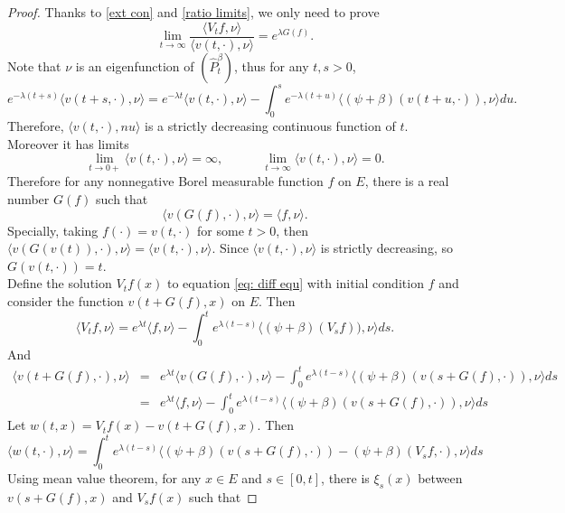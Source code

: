 \documentclass[12pt,a4paper]{amsart}
\theoremstyle{plain}
\theoremstyle{definition}
\numberwithin{equation}{section}
\begin{document}
\begin{proof}
	Thanks to \eqref{ext con} and \eqref{ratio limits}, we only need to prove
\begin{equation}\label{spec ratio}
	\lim_{t\rightarrow\infty}\frac{\langle V_tf,\nu\rangle }{\langle v(t,\cdot),\nu\rangle }=e^{\lambda G(f)}.
\end{equation}
	Note that $\nu$ is an eigenfunction of {\color{red}$(\widehat P^\beta_t)$}, thus for any $t,s>0$,
\begin{equation}\label{ident: monotone}
 	e^{-\lambda(t+s)}\langle v(t+s,\cdot),\nu\rangle =e^{-\lambda t}\langle v(t,\cdot),\nu\rangle -\int_0^se^{-\lambda(t+u)}\langle (\psi+\beta)(v(t+u,\cdot)),\nu\rangle du.
\end{equation}
 	Therefore, $\langle v(t,\cdot),nu\rangle $ is a strictly decreasing continuous function of $t$.  Moreover it has limits
\[
	\lim_{t\rightarrow 0+}\langle v(t,\cdot),\nu\rangle =\infty,\qquad\quad \lim_{t\rightarrow\infty}\langle v(t,\cdot),\nu\rangle =0.
\]
	Therefore for any nonnegative Borel measurable function $f$ on $E$, there is a real number $G(f)$ such that
\begin{equation}\label{def of G}
	\langle v(G(f),\cdot),\nu\rangle =\langle f,\nu\rangle .
\end{equation}
	Specially, taking $f(\cdot)=v(t,\cdot)$ for some $t>0$, then $\langle v(G(v(t)),\cdot),\nu\rangle =\langle v(t,\cdot),\nu\rangle $.
	Since  $\langle v(t,\cdot),\nu\rangle $ is strictly decreasing, so $G(v(t,\cdot))=t$.\\
	Define the solution $V_tf(x)$ to equation \eqref{eq: diff equ} with initial condition $f$ and consider the function $v(t+G(f),x)$ on $E$. Then
\[
	\langle V_tf,\nu\rangle =e^{\lambda t}\langle f,\nu\rangle -\int_0^te^{\lambda(t-s)}\langle (\psi+\beta)(V_sf)),\nu\rangle ds.
\]
	And
\begin{eqnarray*}
	\langle v(t+G(f),\cdot),\nu\rangle &=&e^{\lambda t}\langle v(G(f),\cdot),\nu\rangle -\int_0^te^{\lambda(t-s)}\langle (\psi+\beta)(v(s+G(f),\cdot)),\nu\rangle ds\\
	&=&e^{\lambda t}\langle f,\nu\rangle -\int_0^te^{\lambda (t-s)}\langle (\psi+\beta)(v(s+G(f),\cdot)),\nu\rangle ds
\end{eqnarray*}
	Let $w(t,x)=V_tf(x)-v(t+G(f),x)$. Then
\[
	\langle w(t,\cdot),\nu\rangle =\int_0^te^{\lambda(t-s)}\langle (\psi+\beta)(v(s+G(f),\cdot))-(\psi+\beta)(V_sf,\cdot),\nu\rangle ds
\]
	Using mean value theorem, for any $x\in E$ and $s\in [0,t]$, there is $\xi_s(x)$ between $v(s+G(f),x)$ and $V_sf(x)$ such that

\end{proof}
\end{document}
